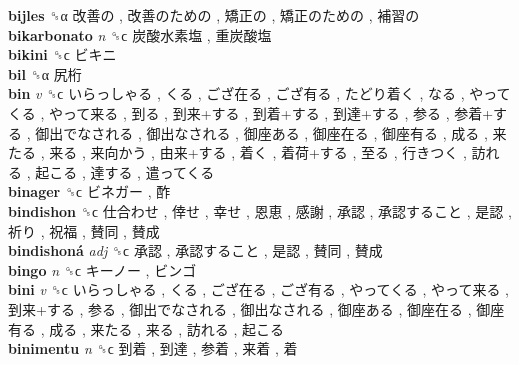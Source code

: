 \textbf{bijles} ␝α   改善の ,  改善のための ,  矯正の ,  矯正のための ,  補習の   \\
\textbf{bikarbonato} \emph{n}  ␝ϲ   炭酸水素塩 ,  重炭酸塩   \\
\textbf{bikini} ␝ϲ   ビキニ   \\
\textbf{bil} ␝α   尻桁   \\
\textbf{bin} \emph{v}  ␝ϲ   いらっしゃる ,  くる ,  ござ在る ,  ござ有る ,  たどり着く ,  なる ,  やってくる ,  やって来る ,  到る ,  到来+する ,  到着+する ,  到達+する ,  参る ,  参着+する ,  御出でなされる ,  御出なされる ,  御座ある ,  御座在る ,  御座有る ,  成る ,  来たる ,  来る ,  来向かう ,  由来+する ,  着く ,  着荷+する ,  至る ,  行きつく ,  訪れる ,  起こる ,  達する ,  遣ってくる   \\
\textbf{binager} ␝ϲ   ビネガー ,  酢   \\
\textbf{bindishon} ␝ϲ   仕合わせ ,  倖せ ,  幸せ ,  恩恵 ,  感謝 ,  承認 ,  承認すること ,  是認 ,  祈り ,  祝福 ,  賛同 ,  賛成   \\
\textbf{bindishoná} \emph{adj}  ␝ϲ   承認 ,  承認すること ,  是認 ,  賛同 ,  賛成   \\
\textbf{bingo} \emph{n}  ␝ϲ   キーノー ,  ビンゴ   \\
\textbf{bini} \emph{v}  ␝ϲ   いらっしゃる ,  くる ,  ござ在る ,  ござ有る ,  やってくる ,  やって来る ,  到来+する ,  参る ,  御出でなされる ,  御出なされる ,  御座ある ,  御座在る ,  御座有る ,  成る ,  来たる ,  来る ,  訪れる ,  起こる   \\
\textbf{binimentu} \emph{n}  ␝ϲ   到着 ,  到達 ,  参着 ,  来着 ,  着   \\
